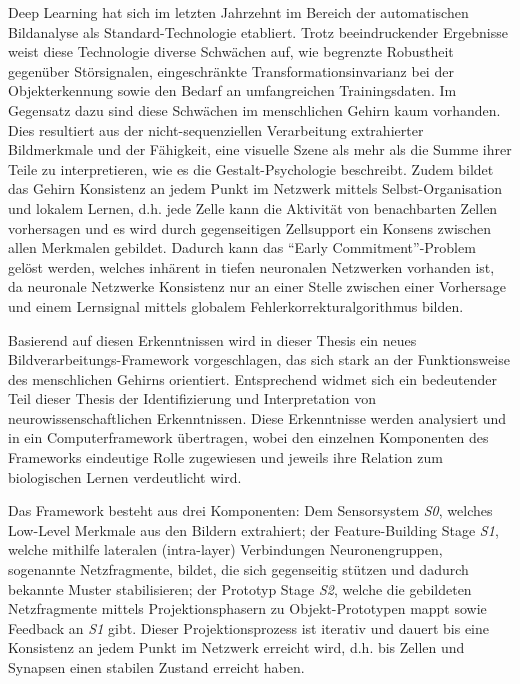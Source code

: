 Deep Learning hat sich im letzten Jahrzehnt im Bereich der automatischen Bildanalyse als Standard-Technologie etabliert.
Trotz beeindruckender Ergebnisse weist diese Technologie diverse Schwächen auf, wie begrenzte Robustheit gegenüber Störsignalen, eingeschränkte Transformationsinvarianz bei der Objekterkennung sowie den Bedarf an umfangreichen Trainingsdaten.
Im Gegensatz dazu sind diese Schwächen im menschlichen Gehirn kaum vorhanden.
Dies resultiert aus der nicht-sequenziellen Verarbeitung extrahierter Bildmerkmale und der Fähigkeit, eine visuelle Szene als mehr als die Summe ihrer Teile zu interpretieren, wie es die Gestalt-Psychologie beschreibt. Zudem bildet das Gehirn Konsistenz an jedem Punkt im Netzwerk mittels Selbst-Organisation und lokalem Lernen, d.h. jede Zelle kann die Aktivität von benachbarten Zellen vorhersagen und es wird durch gegenseitigen Zellsupport ein Konsens zwischen allen Merkmalen gebildet. Dadurch kann das ``Early Commitment''-Problem gelöst werden, welches inhärent in tiefen neuronalen Netzwerken vorhanden ist, da neuronale Netzwerke Konsistenz nur an einer Stelle zwischen einer Vorhersage und einem Lernsignal mittels globalem Fehlerkorrekturalgorithmus bilden.

Basierend auf diesen Erkenntnissen wird in dieser Thesis ein neues Bildverarbeitungs-Framework vorgeschlagen, das sich stark an der Funktionsweise des menschlichen Gehirns orientiert.
Entsprechend widmet sich ein bedeutender Teil dieser Thesis der Identifizierung und Interpretation von neurowissenschaftlichen Erkenntnissen.
Diese Erkenntnisse werden analysiert und in ein Computerframework übertragen, wobei den einzelnen Komponenten des Frameworks eindeutige Rolle zugewiesen und jeweils ihre Relation zum biologischen Lernen verdeutlicht wird.

Das Framework besteht aus drei Komponenten: Dem Sensorsystem \emph{S0}, welches Low-Level Merkmale aus den Bildern extrahiert; der Feature-Building Stage \emph{S1}, welche mithilfe lateralen (intra-layer) Verbindungen Neuronengruppen, sogenannte Netzfragmente, bildet, die sich gegenseitig stützen und dadurch bekannte Muster stabilisieren; der Prototyp Stage \emph{S2}, welche die gebildeten Netzfragmente  mittels Projektionsphasern zu Objekt-Prototypen mappt sowie Feedback an \emph{S1} gibt.
Dieser Projektionsprozess ist iterativ und dauert bis eine Konsistenz an jedem Punkt im Netzwerk erreicht wird, d.h. bis Zellen und Synapsen einen stabilen Zustand erreicht haben.

